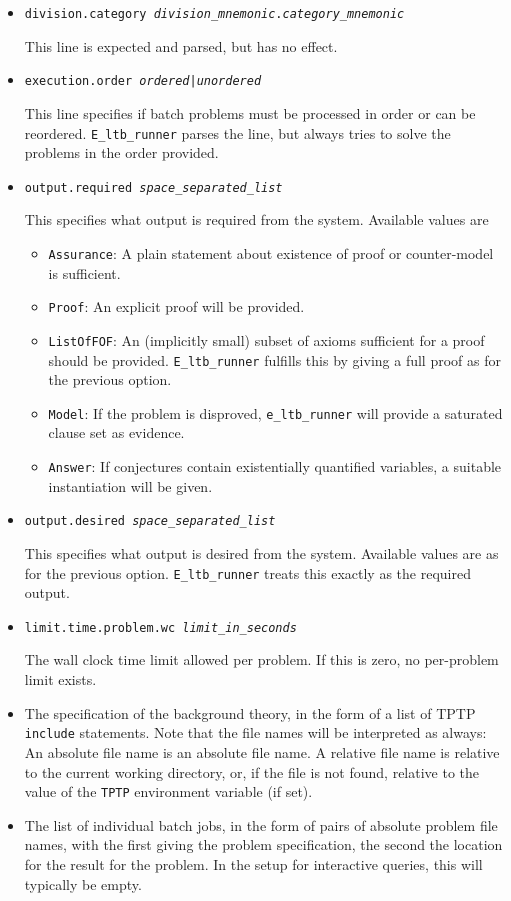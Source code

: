 \documentclass{report}
\begin{document}
\begin{itemize}
\item \texttt{division.category \emph{division\_mnemonic}.\emph{category\_mnemonic}}

  This line is expected and parsed, but has no effect.
\item \texttt{execution.order \emph{ordered}|\emph{unordered}}

  This line specifies if batch problems must be processed in order or
  can be reordered.  \texttt{E\_ltb\_runner} parses the line, but
  always tries to solve the problems in the order provided.
\item \texttt{output.required \emph{space\_separated\_list}}

  This specifies what output is required from the system. Available
  values are
  \begin{itemize}
  \item \texttt{Assurance}: A plain statement about existence of proof
    or counter-model is sufficient.
  \item \texttt{Proof}: An explicit proof will be provided.
  \item \texttt{ListOfFOF}: An (implicitly small) subset of axioms
    sufficient for a proof should be provided. \texttt{E\_ltb\_runner}
    fulfills this by giving a full proof as for the previous option.
  \item \texttt{Model}: If the problem is disproved,
    \texttt{e\_ltb\_runner} will provide a saturated clause set as evidence.
  \item \texttt{Answer}: If conjectures contain existentially
    quantified variables, a suitable instantiation will be given.
  \end{itemize}
\item \texttt{output.desired \emph{space\_separated\_list}}

  This specifies what output is desired from the system. Available
  values are as for the previous option.  \texttt{E\_ltb\_runner}
  treats this exactly as the required output.
\item \texttt{limit.time.problem.wc \emph{limit\_in\_seconds}}

  The wall clock time limit allowed per problem. If this is zero, no
  per-problem limit exists.
\item The specification of the background theory, in the form of a
  list of TPTP \texttt{include} statements. Note that the file names
  will be interpreted as always: An absolute file name is an absolute
  file name. A relative file name is relative to the current working
  directory, or, if the file is not found, relative to the value of
  the \texttt{TPTP} environment variable (if set).
\item The list of individual batch jobs, in the form of pairs of
  absolute problem file names, with the first giving the problem
  specification, the second the location for the result for the
  problem. In the setup for interactive queries, this will typically
  be empty.
\end{itemize}
\end{document}
